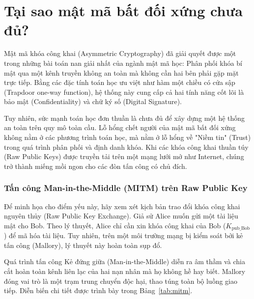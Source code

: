 \section{Tại sao mật mã bất đối xứng chưa đủ?}
\label{sec:2.3}

Mật mã khóa công khai (Asymmetric Cryptography) đã giải quyết được một trong những bài toán nan giải nhất của ngành mật mã học: Phân phối khóa bí mật qua một kênh truyền không an toàn mà không cần hai bên phải gặp mặt trực tiếp. Bằng các đặc tính toán học ưu việt như hàm một chiều có cửa sập (Trapdoor one-way function), hệ thống này cung cấp cả hai tính năng cốt lõi là bảo mật (Confidentiality) và chữ ký số (Digital Signature).

Tuy nhiên, sức mạnh toán học đơn thuần là chưa đủ để xây dựng một hệ thống an toàn trên quy mô toàn cầu. Lỗ hổng chết người của mật mã bất đối xứng không nằm ở các phương trình toán học, mà nằm ở lỗ hổng về "Niềm tin" (Trust) trong quá trình phân phối và định danh khóa. Khi các khóa công khai thuần túy (Raw Public Keys) được truyền tải trên một mạng lưới mở như Internet, chúng trở thành miếng mồi ngon cho các đòn tấn công có chủ đích.

\subsubsection*{Tấn công Man-in-the-Middle (MITM) trên Raw Public Key}

Để minh họa cho điểm yếu này, hãy xem xét kịch bản trao đổi khóa công khai nguyên thủy (Raw Public Key Exchange). Giả sử Alice muốn gửi một tài liệu mật cho Bob. Theo lý thuyết, Alice chỉ cần xin khóa công khai của Bob ($K_{\mathrm{pub\_Bob}}$) để mã hóa tài liệu. Tuy nhiên, trên một môi trường mạng bị kiểm soát bởi kẻ tấn công (Mallory), lý thuyết này hoàn toàn sụp đổ.

Quá trình tấn công Kẻ đứng giữa (Man-in-the-Middle) diễn ra âm thầm và chia cắt hoàn toàn kênh liên lạc của hai nạn nhân mà họ không hề hay biết. Mallory đóng vai trò là một trạm trung chuyển độc hại, thao túng toàn bộ luồng giao tiếp. Diễn biến chi tiết được trình bày trong Bảng~\ref{tab:mitm}.

